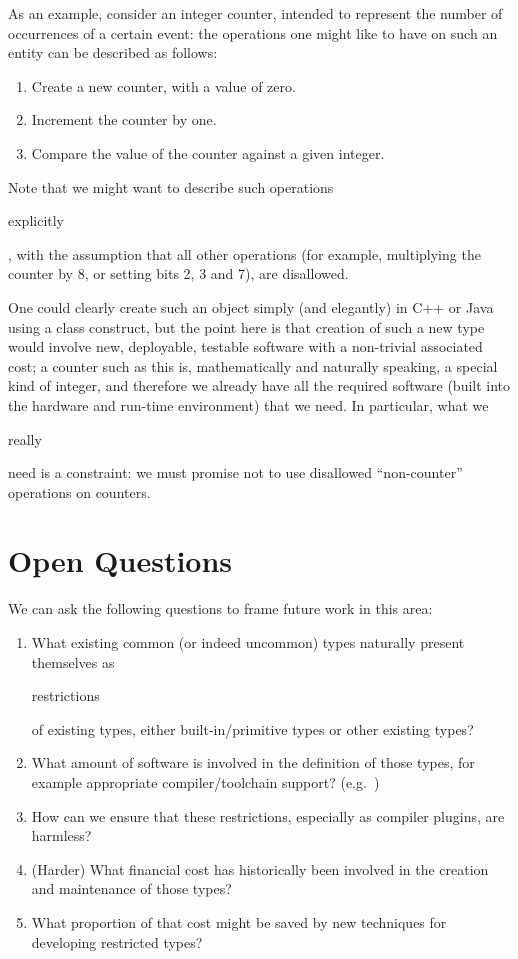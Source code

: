 \documentclass{eceasst}
\begin{document}
As an example, consider an integer counter, intended to represent the
number of occurrences of a certain event: the operations one might like to have
on such an entity can be described as follows:

\begin{enumerate}
\item Create a new counter, with a value of zero.
\item Increment the counter by one.
\item Compare the value of the counter against a given integer.
\end{enumerate}

Note that we might want to describe such operations
\begin{em}explicitly\end{em}, with the assumption that all other
operations (for example, multiplying the counter by 8, or setting bits 2,
3 and 7), are disallowed.

One could clearly create such an object simply (and elegantly) in C++
or Java using a class construct, but the point here is that
creation of such a new type would involve new, deployable, testable
software with a non-trivial associated cost; a counter such as this is,
mathematically and naturally speaking, a special kind of integer, and
therefore we already have all the required software (built into the 
hardware and run-time environment) that we need. In particular, what
we \begin{em}really\end{em} need is a constraint: we must promise not
to use disallowed ``non-counter'' operations on counters.

\section{Open Questions}

We can ask the following questions to frame future work in this area:

\begin{enumerate}
\item What existing common (or indeed uncommon) types naturally
present themselves as \begin{em}restrictions\end{em} of existing
types, either built-in/primitive types or other existing types?
\item What amount of software is involved in the definition of those
types, for example appropriate compiler/toolchain support?
(e.g.~\cite{andreae-et-al:2006,nystrom+saraswat:2007,markstrum-et-al:2010,gccplugins,clangplugins})
\item How can we ensure that these restrictions, especially as
compiler plugins, are harmless?~\cite{nystrom:2011}
\item (Harder) What financial cost has historically been involved in
the creation and maintenance of those types?
\item What proportion of that cost might be saved by new techniques
for developing restricted types?
\end{enumerate}





\end{document}
